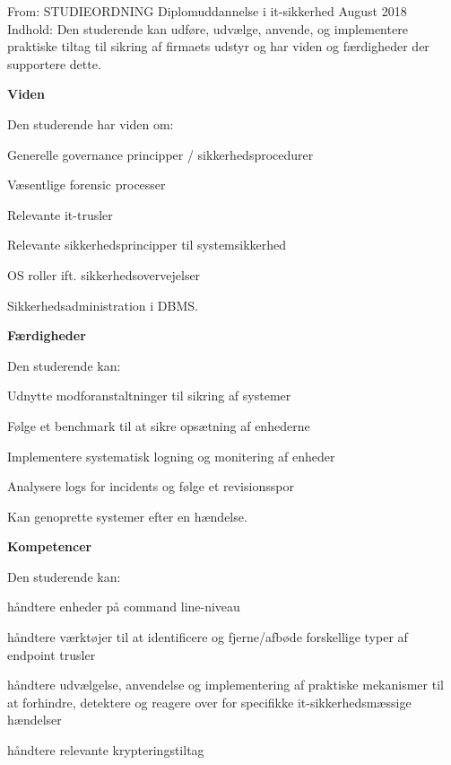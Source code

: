 \documentclass[Screen16to9,17pt]{foils}
\begin{document}

From: STUDIEORDNING Diplomuddannelse i it-sikkerhed August 2018\\
Indhold: Den studerende kan udføre, udvælge, anvende, og implementere praktiske
tiltag til sikring af firmaets udstyr og har viden og færdigheder der supportere dette.

{\bf Viden}

Den studerende har viden om:
\begin{list2}
\item Generelle governance principper / sikkerhedsprocedurer
\item Væsentlige forensic processer
\item Relevante it-trusler
\item Relevante sikkerhedsprincipper til systemsikkerhed
\item OS roller ift. sikkerhedsovervejelser
\item Sikkerhedsadministration i DBMS.
\end{list2}


{\bf Færdigheder}

Den studerende kan:
\begin{list2}
\item Udnytte modforanstaltninger til sikring af systemer
\item Følge et benchmark til at sikre opsætning af enhederne
\item Implementere systematisk logning og monitering af enheder
\item Analysere logs for incidents og følge et revisionsspor
\item Kan genoprette systemer efter en hændelse.
\end{list2}


{\bf Kompetencer}

Den studerende kan:
\begin{list2}
\item håndtere enheder på command line-niveau
\item håndtere værktøjer til at identificere og fjerne/afbøde forskellige typer af endpoint trusler
\item håndtere udvælgelse, anvendelse og implementering af praktiske mekanismer til at forhindre, detektere og reagere over for specifikke it-sikkerhedsmæssige hændelser
\item håndtere relevante krypteringstiltag
\end{list2}
\end{document}

